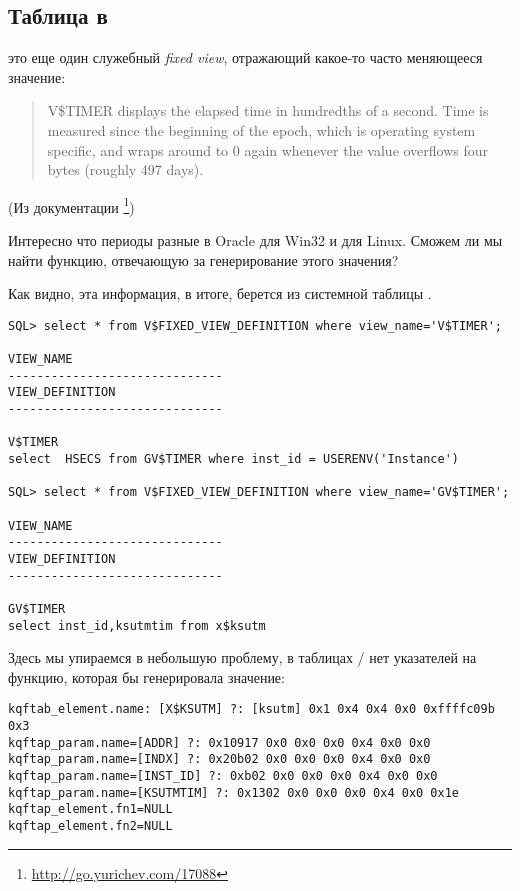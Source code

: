 \subsection{Таблица  в \oracle}
\myindex{\oracle}

 это еще один служебный \emph{fixed view}, отражающий какое-то часто меняющееся значение:

\begin{framed}
\begin{quotation}
V\$TIMER displays the elapsed time in hundredths of a second. Time is measured since the beginning of the epoch, 
which is operating system specific, and wraps around to 0 again whenever the value overflows four bytes 
(roughly 497 days).
\end{quotation}
\end{framed}(Из документации \oracle
\footnote{\url{http://go.yurichev.com/17088}})

Интересно что периоды разные в Oracle для Win32 и для Linux. Сможем ли мы найти функцию, отвечающую 
за генерирование этого значения?

Как видно, эта информация, в итоге, берется из системной таблицы .

\begin{lstlisting}
SQL> select * from V$FIXED_VIEW_DEFINITION where view_name='V$TIMER';

VIEW_NAME
------------------------------
VIEW_DEFINITION
------------------------------

V$TIMER
select  HSECS from GV$TIMER where inst_id = USERENV('Instance')

SQL> select * from V$FIXED_VIEW_DEFINITION where view_name='GV$TIMER';

VIEW_NAME
------------------------------
VIEW_DEFINITION
------------------------------

GV$TIMER
select inst_id,ksutmtim from x$ksutm
\end{lstlisting}

Здесь мы упираемся в небольшую проблему, в таблицах / нет указателей на функцию, 
которая бы генерировала значение:

\begin{lstlisting}[caption=Результат работы \OracleTablesName]
kqftab_element.name: [X$KSUTM] ?: [ksutm] 0x1 0x4 0x4 0x0 0xffffc09b 0x3
kqftap_param.name=[ADDR] ?: 0x10917 0x0 0x0 0x0 0x4 0x0 0x0
kqftap_param.name=[INDX] ?: 0x20b02 0x0 0x0 0x0 0x4 0x0 0x0
kqftap_param.name=[INST_ID] ?: 0xb02 0x0 0x0 0x0 0x4 0x0 0x0
kqftap_param.name=[KSUTMTIM] ?: 0x1302 0x0 0x0 0x0 0x4 0x0 0x1e
kqftap_element.fn1=NULL
kqftap_element.fn2=NULL
\end{lstlisting}

